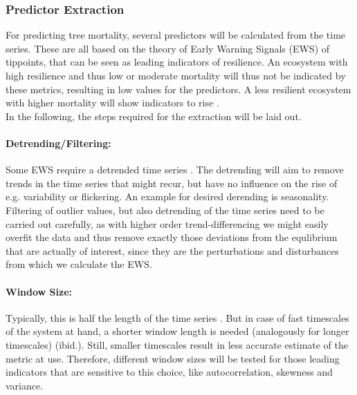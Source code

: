 \subsubsection{Predictor Extraction}
For predicting tree mortality, several predictors will be calculated from the time series. These are all based on the theory of Early Warning Signals (EWS) of \gls{tippoint}s, that can be seen as leading indicators of \gls{resilience}. An ecosystem with high \gls{resilience} and thus low or moderate mortality will thus not be indicated by these metrics, resulting in low values for the predictors. A less resilient ecosystem with higher mortality will show indicators to rise \citep{scheffer2001, scheffer2009a, carpenter2011a, dakos2012, dakos2014}.\\
In the following, the steps required for the extraction will be laid out.

\paragraph{Detrending/Filtering:}
Some EWS require a detrended time series \citep{dakos2012}. The detrending will aim to remove trends in the time series that might recur, but have no influence on the rise of e.g. variability or \gls{flickering}. An example for desired derending is seasonality. Filtering of outlier values, but also detrending of the time series need to be carried out carefully, as with higher order trend-differencing we might easily overfit the data \citep{dakos2008} and thus remove exactly those deviations from the equlibrium that are actually of interest, since they are the perturbations and disturbances from which we calculate the EWS.

\paragraph{Window Size:}
Typically, this is half the length of the time series \citep{dakos2012}. But in case of fast timescales of the system at hand, a shorter window length is needed (analogously for longer timescales) (ibid.). Still, smaller timescales result in less accurate estimate of the metric at use. Therefore, different window sizes will be tested for those leading indicators that are sensitive to this choice, like autocorrelation, skewness and variance.\\

